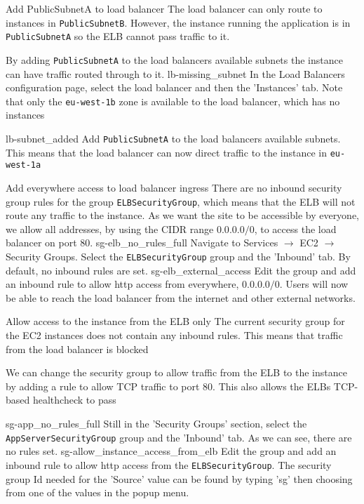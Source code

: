 {Add PublicSubnetA to load balancer}
{
	The load balancer can only route to instances in \texttt{PublicSubnetB}. However, the instance running the application is in \texttt{PublicSubnetA} so the ELB cannot pass traffic to it.
}
{
	By adding \texttt{PublicSubnetA} to the load balancers available subnets the instance can have traffic routed through to it.
	\imagefigsinglebox
	{lb-missing_subnet}
	{In the Load Balancers configuration page, select the load balancer and then the 'Instances' tab. Note that only the \texttt{eu-west-1b} zone is available to the load balancer, which has no instances}
	
	\imagefigsinglebox
		{lb-subnet_added}
	{Add \texttt{PublicSubnetA} to the load balancers available subnets. This means that the load balancer can now direct traffic to the instance in \texttt{eu-west-1a}}
}

\FloatBarrier

{Add everywhere access to load balancer ingress}
{
There are no inbound security group rules for the group \texttt{ELBSecurityGroup}, which means that the ELB will not route any traffic to the instance.
}
{
	As we want the site to be accessible by everyone, we allow all addresses, by using the CIDR range $0.0.0.0/0$, to access the load balancer on port $80$.
	\imagefigsinglebox
	{sg-elb_no_rules_full}
 	{ Navigate to Services  $\rightarrow$ EC2  $\rightarrow$ Security Groups. Select the \texttt{ELBSecurityGroup} group and the 'Inbound' tab. By default, no inbound rules are set.}
	\imagefigsinglebox
	{sg-elb_external_access}
	{Edit the group and add an inbound rule to allow http access from everywhere, $0.0.0.0/0$. Users will now be able to reach the load balancer from the internet and other external networks.}
}


\FloatBarrier


{Allow access to the instance from the ELB only}
{The current security group for the EC2 instances does not contain any inbound rules. This means that traffic from the load balancer is blocked}
{
 We can change the security group to allow traffic from the ELB to the instance by adding a rule to allow TCP traffic to port 80. This also allows the ELBs TCP-based healthcheck to pass
{
	
	\imagefigsinglebox
	{sg-app_no_rules_full}
	{Still in the 'Security Groups' section, select the \texttt{AppServerSecurityGroup} group and the 'Inbound' tab. As we can see, there are no rules set.}
	\imagefigsinglebox
	{sg-allow_instance_access_from_elb}
	{Edit the group and add an inbound rule to allow http access from the \texttt{ELBSecurityGroup}. The security group Id needed for the 'Source' value can be found by typing 'sg' then choosing from one of the values in the popup menu.}
}
}

